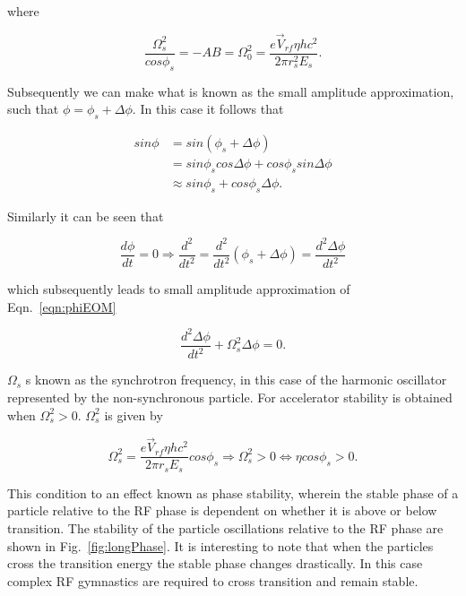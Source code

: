 where 

\begin{equation}
\frac{\Omega_{s}^{2}}{cos\phi_{s}} = -AB = \Omega_{0}^{2} = \frac{e\vec{V}_{rf}\eta hc^{2}}{2\pi r_{s}^{2}E_{s}}.
\end{equation}

Subsequently we can make what is known as the small amplitude approximation, such that $\phi = \phi_{s} + \Delta \phi$. In this case it follows that

\begin{align}
sin \phi &= sin \left( \phi_{s} + \Delta \phi \right) \\
&= sin\phi_{s}cos\Delta \phi + cos\phi_{s} sin \Delta \phi \\
& \approx sin\phi_{s} + cos \phi_{s} \Delta \phi.
\end{align}

Similarly it can be seen that

\begin{equation}
\frac{d\phi}{dt} = 0 \Rightarrow \frac{d^{2}}{dt^{2}} = \frac{d^{2}}{dt^{2}}\left( \phi_{s} + \Delta \phi \right) = \frac{d^{2}\Delta \phi}{dt^{2}}
\end{equation}

which subsequently leads to small amplitude approximation of Eqn.~\ref{eqn:phiEOM}

\begin{equation}
\frac{d^{2}\Delta \phi}{dt^{2}} + \Omega_{s}^{2}\Delta \phi = 0.
\end{equation}

$\Omega_{s}$ s known as the synchrotron frequency, in this case of the harmonic oscillator represented by the non-synchronous particle. For accelerator stability is obtained when $\Omega_{s}^{2} > 0$. $\Omega_{s}^{2}$ is given by

\begin{equation}
\Omega_{s}^{2} = \frac{e\vec{V}_{rf}\eta hc^{2}}{2\pi r_{s} E_{s}} cos \phi_{s} \Rightarrow \Omega_{s}^{2} > 0 \Leftrightarrow \eta cos\phi_{s} > 0.
\end{equation}

This condition to an effect known as phase stability, wherein the stable phase of a particle relative to the RF phase is dependent on whether it is above or below transition. The stability of the particle oscillations relative to the RF phase are shown in Fig.~\ref{fig:longPhase}. It is interesting to note that when the particles cross the transition energy the stable phase changes drastically. In this case complex RF gymnastics are required to cross transition and remain stable.

